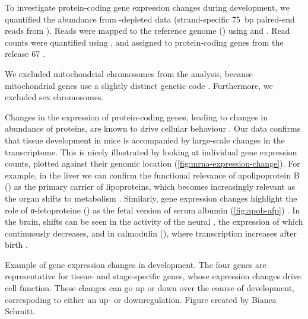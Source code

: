 To investigate protein-coding gene expression changes during development, we
quantified the \mrna abundance from \rrna-depleted \rnaseq data (strand-specific
\SI{75}{bp} paired-end reads from  ). Reads were
mapped to the \mmu reference genome () using
 \citep{Fonseca:2014} and 
\citep{Kim:2013}. Read counts were quantified using 
\citep{Anders:2014}, and assigned to protein-coding genes from the
 release \num{67} \citep{Flicek:2014}.

We excluded mitochondrial chromosomes from the analysis, because mitochondrial
genes use a slightly distinct genetic code \citep{Osawa:1989}. Furthermore, we
excluded sex chromosomes.

Changes in the expression of protein-coding genes, leading to changes in
abundance of proteins, are known to drive cellular behaviour
\citep{Brawand:2011}. Our data confirms that tissue development in mice is
accompanied by large-scale changes in the \mrna transcriptome. This is nicely
illustrated by looking at individual gene expression counts, plotted against
their genomic location (\cref{fig:mrna-expression-change}). For example, in the
liver we can confirm the functional relevance of apolipoprotein B
() as the primary carrier of lipoproteins, which becomes
increasingly relevant as the organ shifts to metabolism \citep{Knott:1986}.
Similarly, \mrna gene expression changes highlight the role of α-fetoproteine
() as the fetal version of serum albumin (\cref{fig:apob-afp})
\citep{Chen:1997}. In the brain, shifts can be seen in the activity of the
neural \tf {}, the expression of which continuously decreases,
and in calmodulin (), where transcription increases after
birth \citep{Tsui:2013,Huang:2011}.

    {Example of gene expression changes in development.}
    {The four genes are representative for tissue- and stage-specific genes,
    whose expression changes drive cell function. These changes can go up or
    down over the course of development, correspoding to either an up- or
    downregulation. Figure created by Bianca Schmitt.}

